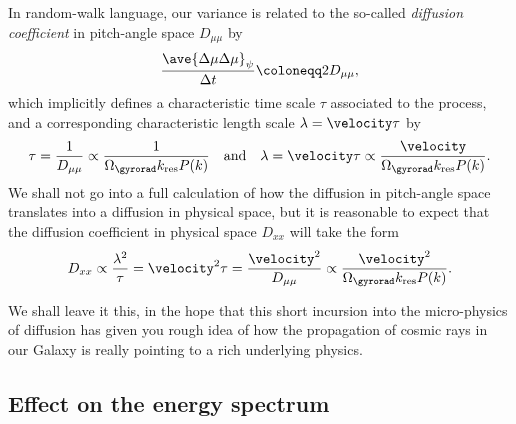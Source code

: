 In random-walk language, our variance is related to the so-called
\emph{diffusion coefficient}
in pitch-angle space $D_{\mu\mu}$ by
\begin{align*}
  \frac{\ave{\Delta \mu \Delta \mu}_\psi}{\Delta t} \coloneqq 2 D_{\mu\mu},
\end{align*}
which implicitly defines a characteristic time scale $\tau$ associated to the
process, and a corresponding characteristic length scale $\lambda = \velocity \tau$ by
\begin{align*}
  \tau = \frac{1}{D_{\mu\mu}} \propto
  \frac{1}{\Omega_\gyrorad k_\text{res} P(k)}
  \quad\text{and}\quad
  \lambda = \velocity \tau \propto \frac{\velocity}{\Omega_\gyrorad k_\text{res} P(k)}.
\end{align*}
We shall not go into a full calculation of how the diffusion in pitch-angle space
translates into a diffusion in physical space, but it is reasonable to expect that
the diffusion coefficient in physical space $D_{xx}$ will take the form
\begin{align*}
  D_{xx} \propto \frac{\lambda^2}{\tau} = \velocity^2 \tau = \frac{\velocity^2}{D_{\mu\mu}} \propto
  \frac{\velocity^2}{\Omega_\gyrorad k_\text{res} P(k)}.
\end{align*}

We shall leave it this, in the hope that this short incursion into the micro-physics
of diffusion has given you rough idea of how the propagation of cosmic rays in our Galaxy
is really pointing to a rich underlying physics.


\subsection{Effect on the energy spectrum}

